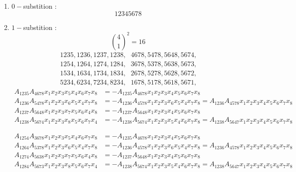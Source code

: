 \documentclass[aps, preprint]{revtex4}
\begin{document}
\begin{enumerate}
\item $0 -$substition :
\begin{equation}12345678
\end{equation}

\item $1 -$substition :
\begin{equation}\binom{4}{1}^{2} =16
\end{equation}
\begin{equation}\begin{array}{cc}1235,1236,1237,1238\text{,} & 4678,5478,5648,5674\text{,} \\
1254,1264,1274,1284\text{,} & 3678,5378,5638,5673\text{,} \\
1534,1634,1734,1834\text{,} & 2678,5278,5628,5672\text{,} \\
5234,6234,7234,8234\text{,} & 1678,5178,5618,5671\text{,}\end{array}
\end{equation}
\begin{align}A_{1 2 3 5} A_{4 6 7 8} x_{1} x_{2} x_{3} x_{5} x_{4} x_{6} x_{7} x_{8} &  = -A_{1 2 3 5} A_{4 6 7 8} x_{1} x_{2} x_{3} x_{4} x_{5} x_{6} x_{7} x_{8} \\
A_{1 2 3 6} A_{5 4 7 8} x_{1} x_{2} x_{3} x_{6} x_{5} x_{4} x_{7} x_{8} &  = -A_{1 2 3 6} A_{4 5 7 8} x_{1} x_{2} x_{3} x_{6} x_{5} x_{4} x_{7} x_{8} =A_{1 2 3 6} A_{4 5 7 8} x_{1} x_{2} x_{3} x_{4} x_{5} x_{6} x_{7} x_{8} \\
A_{1 2 3 7} A_{5 6 4 8} x_{1} x_{2} x_{3} x_{7} x_{5} x_{6} x_{4} x_{8} &  = -A_{1 2 3 7} A_{5 6 4 8} x_{1} x_{2} x_{3} x_{4} x_{5} x_{6} x_{7} x_{8} \\
A_{1 2 3 8} A_{5 6 7 4} x_{1} x_{2} x_{3} x_{8} x_{5} x_{6} x_{7} x_{4} &  = -A_{1 2 3 8} A_{5 6 7 4} x_{1} x_{2} x_{3} x_{5} x_{4} x_{6} x_{7} x_{8} =A_{1 2 3 8} A_{5 6 4 7} x_{1} x_{2} x_{3} x_{4} x_{5} x_{6} x_{7} x_{8}\end{align}


\begin{align}A_{1 2 5 4} A_{3 6 7 8} x_{1} x_{2} x_{3} x_{5} x_{4} x_{6} x_{7} x_{8} &  = -A_{1 2 3 5} A_{4 6 7 8} x_{1} x_{2} x_{3} x_{4} x_{5} x_{6} x_{7} x_{8} \\
A_{1 2 6 4} A_{5 3 7 8} x_{1} x_{2} x_{3} x_{6} x_{5} x_{4} x_{7} x_{8} &  = -A_{1 2 3 6} A_{4 5 7 8} x_{1} x_{2} x_{3} x_{6} x_{5} x_{4} x_{7} x_{8} =A_{1 2 3 6} A_{4 5 7 8} x_{1} x_{2} x_{3} x_{4} x_{5} x_{6} x_{7} x_{8} \\
A_{1 2 7 4} A_{5 6 3 8} x_{1} x_{2} x_{3} x_{7} x_{5} x_{6} x_{4} x_{8} &  = -A_{1 2 3 7} A_{5 6 4 8} x_{1} x_{2} x_{3} x_{4} x_{5} x_{6} x_{7} x_{8} \\
A_{1 2 8 4} A_{5 6 7 3} x_{1} x_{2} x_{3} x_{8} x_{5} x_{6} x_{7} x_{4} &  = -A_{1 2 3 8} A_{5 6 7 4} x_{1} x_{2} x_{3} x_{5} x_{4} x_{6} x_{7} x_{8} =A_{1 2 3 8} A_{5 6 4 7} x_{1} x_{2} x_{3} x_{4} x_{5} x_{6} x_{7} x_{8}\end{align}



\end{enumerate}
\end{document}
